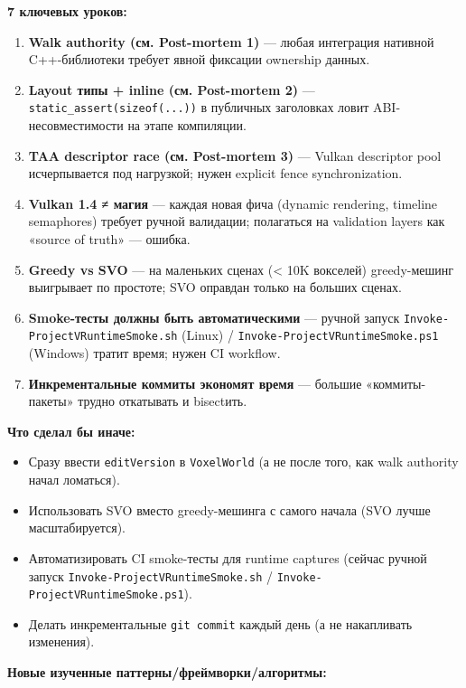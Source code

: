 \textbf{7 ключевых уроков:}

\begin{enumerate}
\def\labelenumi{\arabic{enumi}.}
\tightlist
\item
  \textbf{Walk authority (см. Post-mortem 1)} --- любая интеграция нативной C++-библиотеки требует явной фиксации ownership данных.
\item
  \textbf{Layout типы + inline (см. Post-mortem 2)} --- \texttt{static\_assert(sizeof(...))} в публичных заголовках ловит ABI-несовместимости на этапе компиляции.
\item
  \textbf{TAA descriptor race (см. Post-mortem 3)} --- Vulkan descriptor pool исчерпывается под нагрузкой; нужен explicit fence synchronization.
\item
  \textbf{Vulkan 1.4 ≠ магия} --- каждая новая фича (dynamic rendering, timeline semaphores) требует ручной валидации; полагаться на validation layers как «source of truth» --- ошибка.
\item
  \textbf{Greedy vs SVO} --- на маленьких сценах (\textless{} 10K вокселей) greedy-мешинг выигрывает по простоте; SVO оправдан только на больших сценах.
\item
  \textbf{Smoke-тесты должны быть автоматическими} --- ручной запуск \texttt{Invoke-ProjectVRuntimeSmoke.sh} (Linux) / \texttt{Invoke-ProjectVRuntimeSmoke.ps1} (Windows) тратит время; нужен CI workflow.
\item
  \textbf{Инкрементальные коммиты экономят время} --- большие «коммиты-пакеты» трудно откатывать и bisect\textquotesingle ить.
\end{enumerate}

\textbf{Что сделал бы иначе:}

\begin{itemize}
\tightlist
\item
  Сразу ввести \texttt{editVersion} в \texttt{VoxelWorld} (а не после того, как walk authority начал ломаться).
\item
  Использовать SVO вместо greedy-мешинга с самого начала (SVO лучше масштабируется).
\item
  Автоматизировать CI smoke-тесты для runtime captures (сейчас ручной запуск \texttt{Invoke-ProjectVRuntimeSmoke.sh} / \texttt{Invoke-ProjectVRuntimeSmoke.ps1}).
\item
  Делать инкрементальные \texttt{git\ commit} каждый день (а не накапливать изменения).
\end{itemize}

\textbf{Новые изученные паттерны/фреймворки/алгоритмы:}

